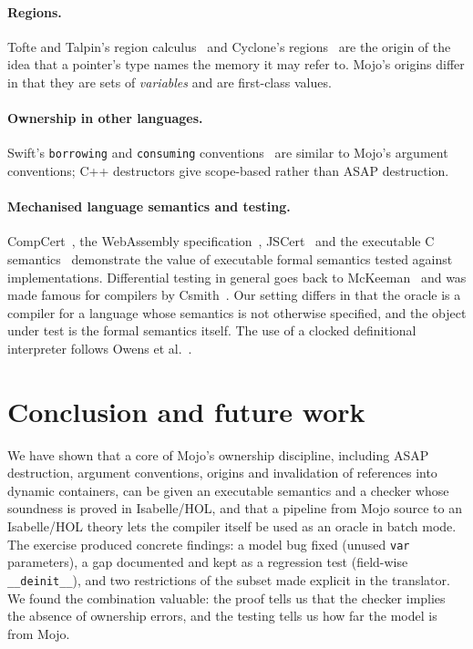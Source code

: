 \documentclass[11pt,a4paper]{article}
\newcommand{\IHOL}{Isabelle/HOL}
\newcommand{\code}[1]{\texttt{#1}}
\begin{document}
\paragraph{Regions.} Tofte and Talpin's region calculus~\cite{tofte} and Cyclone's
regions~\cite{cyclone} are the origin of the idea that a pointer's type names
the memory it may refer to. Mojo's origins differ in that they are sets of
\emph{variables} and are first-class values.

\paragraph{Ownership in other languages.} Swift's \code{borrowing} and
\code{consuming} conventions~\cite{se0377} are similar to Mojo's argument
conventions; C++ destructors give scope-based rather than ASAP destruction.

\paragraph{Mechanised language semantics and testing.} CompCert~\cite{compcert},
the WebAssembly specification~\cite{watt}, JSCert~\cite{jscert} and the executable
C semantics~\cite{ellison} demonstrate the value of executable formal
semantics tested against implementations. Differential testing in general goes
back to McKeeman~\cite{mckeeman} and was made famous for compilers by
Csmith~\cite{csmith}. Our setting differs in that the oracle is a compiler for
a language whose semantics is not otherwise specified, and the object under test
is the formal semantics itself. The use of a clocked definitional interpreter
follows Owens et al.~\cite{owens-fbs}.

\section{Conclusion and future work} \label{sec:concl}

We have shown that a core of Mojo's ownership discipline, including ASAP
destruction, argument conventions, origins and invalidation of references into
dynamic containers, can be given an executable semantics and a checker whose
soundness is proved in \IHOL{}, and that a pipeline from Mojo source to an
\IHOL{} theory lets the compiler itself be used as an oracle in batch mode. The
exercise produced concrete findings: a model bug fixed (unused \code{var}
parameters), a gap documented and kept as a regression test (field-wise
\code{\_\_deinit\_\_}), and two restrictions of the subset made explicit in the
translator. We found the combination valuable: the proof tells us that
the checker implies the absence of ownership errors, and the testing tells us
how far the model is from Mojo.
\end{document}
